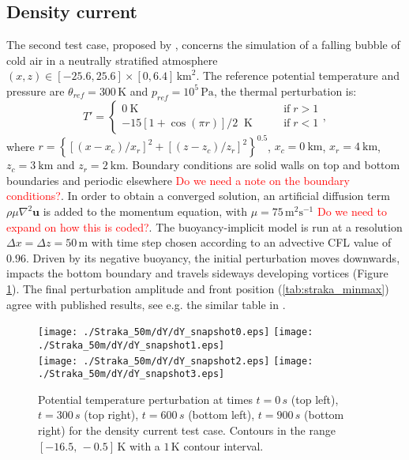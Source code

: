 \documentclass{ametsoc}
\theoremstyle{definition}
\newcommand{\benacchio}[1]{\textcolor{red}{#1}}
\begin{document}
\subsection{Density current}

The second test case, proposed by \cite{StrakaEtAl1993}, concerns the simulation of a falling bubble of cold air in a neutrally stratified atmosphere $(x,z)\in[-25.6,25.6]\times[0,6.4]\,\textrm{km}^2$. The reference potential temperature and pressure  are $\theta_{ref}=300\,\textrm{K}$ and $p_{ref}=10^5\,\textrm{Pa}$, the thermal perturbation is:
%
\begin{equation}
 T'=\begin{cases}
           0~\textrm{K} \qquad&\textrm{if}\;r>1\\
	   -15\left[1+\cos(\pi r)\right]/2 \;\;\textrm{K}\qquad&\textrm{if}\;r<1   
          \end{cases},
\end{equation} 
%
where $r=\left\{[(x-x_c)/x_r]^2+[(z-z_c)/z_r]^2\right\}^{0.5}$, $x_c=0~\textrm{km}$, $x_r=4~\textrm{km}$, $z_c=3~\textrm{km}$ and $z_r=2~\textrm{km}$. 
%
Boundary conditions are solid walls on top and bottom boundaries and periodic elsewhere \benacchio{Do we need a note on the boundary conditions?}. In order to obtain a converged solution, an artificial diffusion term $\rho\mu\nabla^2\mathbf{u}$ is added to the momentum equation, with $\mu=75\,\textrm{m$^2$s$^{-1}$}$ \benacchio{Do we need to expand on how this is coded?}. The buoyancy-implicit model is run at a resolution $\Delta x=\Delta z=50\,\textrm{m}$ with time step chosen according to an advective CFL value of $0.96$. Driven by its negative buoyancy, the initial perturbation moves downwards, impacts the bottom boundary and travels sideways developing vortices (Figure \ref{fig:straka}). The final perturbation amplitude and front position (\ref{tab:straka_minmax}) agree with published results, see e.g. the similar table in \cite{MelvinEtAl2018}. 

\begin{figure}
\centering
 \texttt{[image: ./Straka\_50m/dY/dY\_snapshot0.eps]}
 \texttt{[image: ./Straka\_50m/dY/dY\_snapshot1.eps]}\\
 \texttt{[image: ./Straka\_50m/dY/dY\_snapshot2.eps]}
 \texttt{[image: ./Straka\_50m/dY/dY\_snapshot3.eps]}
 \caption{Potential temperature perturbation at times $t=0\, s$ (top left), $t=300\, s$ (top right), $t=600\, s$ (bottom left), $t=900\, s$ (bottom right) for the density current test case. Contours in the range $[-16.5,\,-0.5]\,\textrm{K}$ with a $1\,\textrm{K}$ contour interval.}
 \label{fig:straka}
\end{figure}
\end{document}
